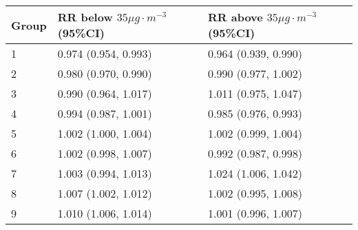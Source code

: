 \begin{tabular}{lll}
  \hline
Group & RR below $35 \mu g \cdot m^{-3}$ (95\%CI) & RR above $35 \mu g \cdot m^{-3}$ (95\%CI) \\ 
  \hline
   1 & 0.974 (0.954, 0.993) & 0.964 (0.939, 0.990) \\ 
     2 & 0.980 (0.970, 0.990) & 0.990 (0.977, 1.002) \\ 
     3 & 0.990 (0.964, 1.017) & 1.011 (0.975, 1.047) \\ 
     4 & 0.994 (0.987, 1.001) & 0.985 (0.976, 0.993) \\ 
     5 & 1.002 (1.000, 1.004) & 1.002 (0.999, 1.004) \\ 
     6 & 1.002 (0.998, 1.007) & 0.992 (0.987, 0.998) \\ 
     7 & 1.003 (0.994, 1.013) & 1.024 (1.006, 1.042) \\ 
     8 & 1.007 (1.002, 1.012) & 1.002 (0.995, 1.008) \\ 
     9 & 1.010 (1.006, 1.014) & 1.001 (0.996, 1.007) \\ 
   \hline
\end{tabular}

